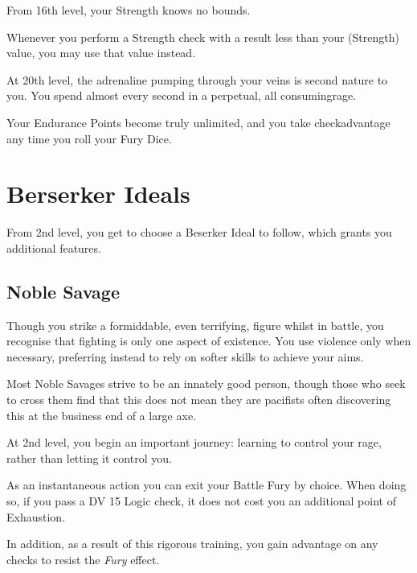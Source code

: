 {
	From 16th level, your Strength knows no bounds. 
	
	Whenever you perform a Strength check with a result less than your \attPhys{} (Strength) value, you may use that value instead. 
}

{
	At 20th level, the adrenaline pumping through your veins is second nature to you. You spend almost every second in a perpetual, all consuming\minus{}rage. 
	
	Your Endurance Points become truly unlimited, and you take check\minus{}advantage any time you roll your Fury Dice. 
}


\section*{Berserker Ideals}

From 2nd level, you get to choose a Beserker Ideal to follow, which grants you additional features. 

\subsection*{Noble Savage}

Though you strike a formiddable, even terrifying, figure whilst in battle, you recognise that fighting is only one aspect of existence. You use violence only when necessary, preferring instead to rely on softer skills to achieve your aims. 

Most Noble Savages strive to be an innately good person, though those who seek to cross them find that this does not mean they are pacifists \minus{} often discovering this at the business end of a large axe. 


{
	At 2nd level, you begin an important journey: learning to control your rage, rather than letting it control you. 
	
	As an instantaneous action you can exit your Battle Fury by choice. When doing so, if you pass a DV 15 Logic check, it does not cost you an additional point of Exhaustion.

	In addition, as a result of this rigorous training, you gain advantage on any checks to resist the {\it Fury} effect. 
}


